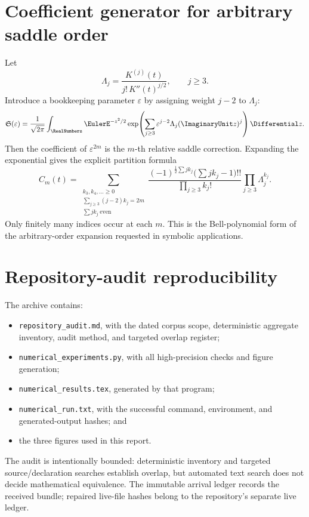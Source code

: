 \documentclass[11pt,oneside]{article}
\theoremstyle{definition}
\theoremstyle{remark}
\begin{document}
\section{Coefficient generator for arbitrary saddle order}

Let
\[
 \Lambda_j=\frac{K^{(j)}(t)}{j!\,K''(t)^{j/2}},
 \qquad j\geq3.
\]
Introduce a bookkeeping parameter \(\varepsilon\) by assigning weight
\(j-2\) to \(\Lambda_j\):
\[
 \mathfrak S(\varepsilon)
 =
 \frac1{\sqrt{2\pi}}\int_\RealNumbers\EulerE^{-z^2/2}
 \exp\!\left(
  \sum_{j\geq3}
   \varepsilon^{j-2}\Lambda_j(\ImaginaryUnit z)^j
 \right)\Differential z.
\]
Then the coefficient of \(\varepsilon^{2m}\) is the \(m\)-th relative
saddle correction.  Expanding the exponential gives the explicit partition
formula
\[
 C_m(t)=
 \sum_{\substack{k_3,k_4,\ldots\geq0\\
                 \sum_{j\geq3}(j-2)k_j=2m\\
                 \sum j k_j\ \mathrm{even}}}
 \frac{(-1)^{\frac12\sum j k_j}
       \bigl(\sum j k_j-1\bigr)!!}
      {\prod_{j\geq3}k_j!}
 \prod_{j\geq3}\Lambda_j^{k_j}.
\]
Only finitely many indices occur at each \(m\).  This is the Bell-polynomial
form of the arbitrary-order expansion requested in symbolic applications.

\section{Repository-audit reproducibility}

The archive contains:
\begin{itemize}[leftmargin=2em]
\item \texttt{repository\_audit.md}, with the dated corpus scope, deterministic
      aggregate inventory, audit method, and targeted overlap register;
\item \texttt{numerical\_experiments.py}, with all high-precision checks and
      figure generation;
\item \texttt{numerical\_results.tex}, generated by that program;
\item \texttt{numerical\_run.txt}, with the successful command, environment,
      and generated-output hashes; and
\item the three figures used in this report.
\end{itemize}
The audit is intentionally bounded: deterministic inventory and targeted
source/declaration searches establish overlap, but automated text search does
not decide mathematical equivalence.  The immutable arrival ledger records
the received bundle; repaired live-file hashes belong to the repository's
separate live ledger.
\end{document}
